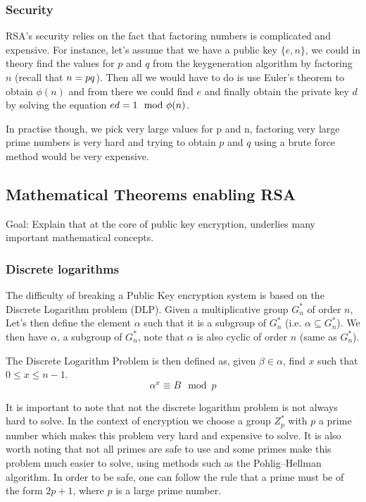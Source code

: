 \documentclass[conference]{IEEEtran}
\begin{document}
\subsubsection{Security}
RSA's security relies on the fact that factoring numbers is complicated and expensive.
For instance, let's assume that we have a public key $\{e,n\}$, we could in theory find
the values for $p$ and $q$ from the keygeneration algorithm by factoring $n$ (recall that $n = p\*q$). Then all we would have to do is 
use Euler's theorem to obtain $\phi(n)$ and from there we could find $e$ and finally 
obtain the private key $d$ by solving the equation $e\*d = 1\mod \phi(n)$.

In practise though, we pick very large values for p and n, factoring very large prime
numbers is very hard and trying to obtain $p$ and $q$ using a brute force method
would be very expensive.


\subsection{Mathematical Theorems enabling RSA}
Goal: Explain that at the core of public key encryption, underlies
many important mathematical concepts.


\subsubsection{Discrete logarithms}
The difficulty of breaking a Public Key encryption system is based on the 
Discrete Logarithm problem (DLP). 
Given a multiplicative group $G_{n}^{*}$ of order $n$,
Let's then define the element $\alpha$ such that it is a subgroup of $G_{n}^{*}$ 
(i.e. $\alpha \subseteq G_{n}^{*}$). We then have $\alpha$, a subgroup of $G_{n}^{*}$,
note that $\alpha$ is also cyclic of order $n$ (same as $G_{n}^{*}$).


The Discrete Logarithm Problem is then defined as, given $\beta \in \alpha$,
find $x$ such that $0 \leq x \leq n - 1$.
\begin{equation}
    \alpha^{x} \equiv B\mod p
\end{equation}

It is important to note that not the discrete logarithm problem
is not always hard to solve. In the context of encryption we choose a group
$Z_{p}^*$ with $p$ a prime number which makes this problem very hard and 
expensive to solve.
It is also worth noting that not all primes are safe to use and some primes
make this problem much easier to solve, using methods such as the 
Pohlig–Hellman algorithm. In order to be safe, one can follow the rule
that a prime must be of the form $2p + 1$, where $p$ is a large prime number. 
\end{document}
